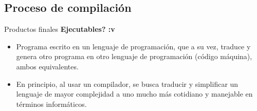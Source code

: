 
\subsection{Proceso de compilación}

\begin{frame}[fragile]{Productos finales}
\textbf{Ejecutables? :v}
  \begin{itemize}[<+(1)->]
  \item Programa  escrito en un lenguaje de programación, que a su vez, traduce y genera otro programa
en otro lenguaje de programación (código máquina), ambos equivalentes.
  \item En principio, al usar un compilador, se busca traducir y simplificar un lenguaje de mayor complejidad a uno mucho más cotidiano y manejable en términos informáticos.
 \end{itemize}
\end{frame}
